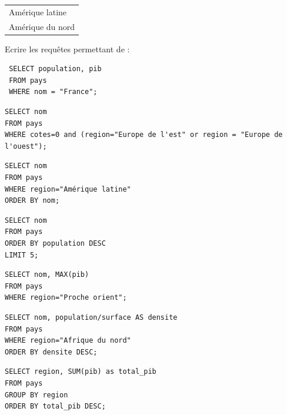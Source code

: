 \documentclass[11pt,a4paper]{article}
\begin{document}
\begin{Exercise}[title={requête {\sc sql} sur une seule table}]
\begin{center}
\begin{tabular}{|l|}
		Amérique latine\\
		Amérique du nord\\
		\hline
	\end{tabular}
\end{center}
Ecrire les requêtes permettant de :
\begin{verbatim}
 SELECT population, pib 
 FROM pays 
 WHERE nom = "France";
\end{verbatim}
\begin{verbatim}
SELECT nom 
FROM pays 
WHERE cotes=0 and (region="Europe de l'est" or region = "Europe de l'ouest");
\end{verbatim}
\begin{verbatim}
SELECT nom 
FROM pays 
WHERE region="Amérique latine" 
ORDER BY nom;
\end{verbatim}
\begin{verbatim}
SELECT nom
FROM pays
ORDER BY population DESC
LIMIT 5;
\end{verbatim}
\begin{verbatim}
SELECT nom, MAX(pib)
FROM pays
WHERE region="Proche orient";
\end{verbatim}
\begin{verbatim}
SELECT nom, population/surface AS densite
FROM pays 
WHERE region="Afrique du nord" 
ORDER BY densite DESC;
\end{verbatim}
\begin{verbatim}
SELECT region, SUM(pib) as total_pib 
FROM pays 
GROUP BY region 
ORDER BY total_pib DESC;
\end{verbatim}




\end{Exercise}

	
\end{document}
